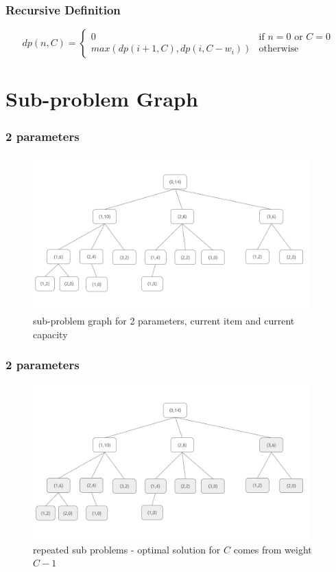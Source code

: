 \documentclass{beamer}
\begin{document}
\begin{frame}
	\frametitle{Recursive Definition}
	\[
		dp(n, C) = \begin{cases}
					0 & \text{if } n = 0 \text{ or } C = 0 \\
					max(dp(i+1, C), dp(i, C-w_i)) & \text{otherwise} 
				\end{cases}
	\]
\end{frame}

\section{Sub-problem Graph}
\begin{frame}
	\frametitle{2 parameters}
	\begin{figure}
		\centering
		\includegraphics[width=0.95\textwidth]{asset/1.png}
		\caption{sub-problem graph for 2 parameters, current item and current capacity}
	\end{figure}	
\end{frame}

\begin{frame}
	\frametitle{2 parameters}
	\begin{figure}
		\centering
		\includegraphics[width=0.95\textwidth]{asset/2.png}
		\caption{repeated sub problems - optimal solution for \( C \) comes from weight \( C-1 \) }
	\end{figure}	
\end{frame}
\end{document}
